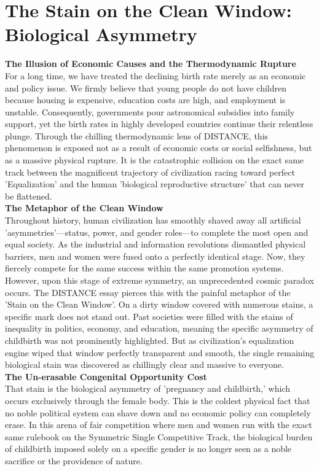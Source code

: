 

\section{The Stain on the Clean Window: Biological Asymmetry}
\textbf{The Illusion of Economic Causes and the Thermodynamic Rupture} \\
For a long time, we have treated the declining birth rate merely as an economic and policy issue. We firmly believe that young people do not have children because housing is expensive, education costs are high, and employment is unstable. Consequently, governments pour astronomical subsidies into family support, yet the birth rates in highly developed countries continue their relentless plunge. Through the chilling thermodynamic lens of DISTANCE, this phenomenon is exposed not as a result of economic costs or social selfishness, but as a massive physical rupture. It is the catastrophic collision on the exact same track between the magnificent trajectory of civilization racing toward perfect 'Equalization' and the human 'biological reproductive structure' that can never be flattened. \\
\textbf{The Metaphor of the Clean Window} \\
Throughout history, human civilization has smoothly shaved away all artificial 'asymmetries'—status, power, and gender roles—to complete the most open and equal society. As the industrial and information revolutions dismantled physical barriers, men and women were fused onto a perfectly identical stage. Now, they fiercely compete for the same success within the same promotion systems.
However, upon this stage of extreme symmetry, an unprecedented cosmic paradox occurs. The DISTANCE essay pierces this with the painful metaphor of the 'Stain on the Clean Window'. On a dirty window covered with numerous stains, a specific mark does not stand out. Past societies were filled with the stains of inequality in politics, economy, and education, meaning the specific asymmetry of childbirth was not prominently highlighted. But as civilization's equalization engine wiped that window perfectly transparent and smooth, the single remaining biological stain was discovered as chillingly clear and massive to everyone. \\
\textbf{The Un-erasable Congenital Opportunity Cost} \\
That stain is the biological asymmetry of 'pregnancy and childbirth,' which occurs exclusively through the female body. This is the coldest physical fact that no noble political system can shave down and no economic policy can completely erase. In this arena of fair competition where men and women run with the exact same rulebook on the Symmetric Single Competitive Track, the biological burden of childbirth imposed solely on a specific gender is no longer seen as a noble sacrifice or the providence of nature.
